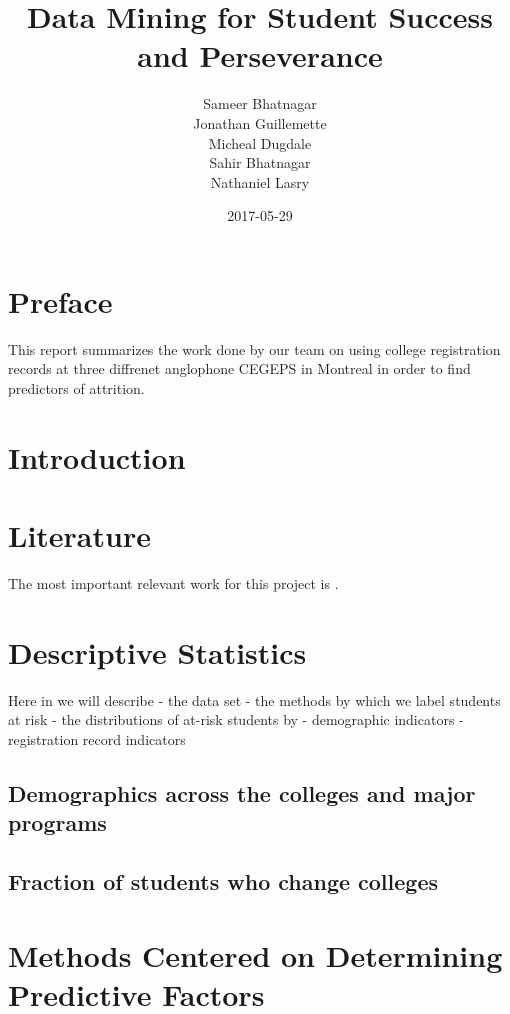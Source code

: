 \documentclass[]{book}
\title{Data Mining for Student Success and Perseverance}
\author{Sameer Bhatnagar \\ Jonathan Guillemette \\ Micheal Dugdale \\ Sahir Bhatnagar \\ Nathaniel Lasry}
\date{2017-05-29}
\theoremstyle{definition}
\theoremstyle{definition}
\theoremstyle{remark}
\begin{document}
\maketitle

{
\setcounter{tocdepth}{1}
\tableofcontents
}
\chapter{Preface}\label{preface}

This report summarizes the work done by our team on using college
registration records at three diffrenet anglophone CEGEPS in Montreal in
order to find predictors of attrition.

\chapter{Introduction}\label{intro}

\chapter{Literature}\label{literature}

The most important relevant work for this project is
\citep{jorgensen_predicting_2009}.

\chapter{Descriptive Statistics}\label{descriptive-statistics}

Here in we will describe - the data set - the methods by which we label
students at risk - the distributions of at-risk students by -
demographic indicators - registration record indicators

\section{Demographics across the colleges and major
programs}\label{demographics-across-the-colleges-and-major-programs}

\section{Fraction of students who change
colleges}\label{fraction-of-students-who-change-colleges}

\chapter{Methods Centered on Determining Predictive
Factors}\label{methods-centered-on-determining-predictive-factors}
\end{document}

